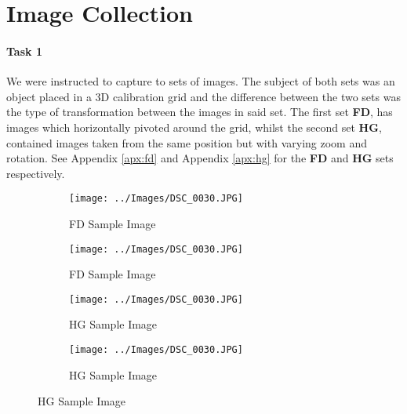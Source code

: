 \section{Image Collection}

\paragraph{Task 1} We were instructed to capture to sets of images. The subject of both sets was an object placed in a 3D calibration grid and the difference between the two sets was the type of transformation between the images in said set. The first set \textbf{FD}, has images which horizontally pivoted around the grid, whilst the second set \textbf{HG}, contained images taken from the same position but with varying zoom and rotation. See Appendix \ref{apx:fd} and Appendix \ref{apx:hg} for the \textbf{FD} and \textbf{HG} sets respectively.

\begin{figure}[ht]
\begin{center}
   \begin{subfigure}{0.49\linewidth}
   \centering
   \texttt{[image: ../Images/DSC\_0030.JPG]}
   \caption{FD Sample Image}
   \label{fd:subfig:1}
   \end{subfigure}
   \begin{subfigure}{0.49\linewidth}
   \centering
   \texttt{[image: ../Images/DSC\_0030.JPG]}
   \caption{FD Sample Image}
   \label{fd:subfig:2}
   \end{subfigure}
\newline
   \begin{subfigure}{0.49\linewidth}
   \centering
   \texttt{[image: ../Images/DSC\_0030.JPG]}
   \caption{HG Sample Image}
   \label{hg:subfig:1}
   \end{subfigure}
   \begin{subfigure}{0.49\linewidth}
   \centering
   \texttt{[image: ../Images/DSC\_0030.JPG]}
   \caption{HG Sample Image}
   \label{hg:subfig:2}
   \end{subfigure}
\end{center}
\label{fig:1}
\end{figure}
